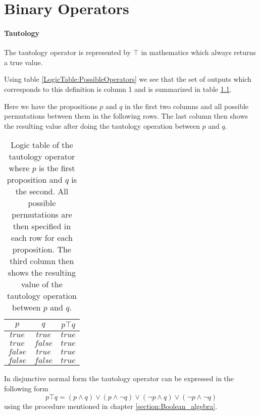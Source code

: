 \appendix

\chapter{Binary Operators}
\label{appendix:Binaray_Operators}
    \subsubsection{Tautology}
        The tautology operator is represented by $\top$ in mathematics which always returns a true value.
        
        Using table \ref{LogicTable:PossibleOperators} we see that the set of outputs which corresponds to this definition is column 1 and is summarized in table \ref{LogicTable:tautology}.
        
        Here we have the propositions $p$ and $q$ in the first two columns and all possible permutations between them in the following rows. The last column then shows the resulting value after doing the tautology operation between $p$ and $q$.
        
        \begin{table}[h!]
            \centering
            \begin{tabular}{|c|c|c|}
            	\hline
            	  $p$   &   $q$   & $p \top q$ \\ \hline
            	$true$  & $true$  &   $true$   \\ \hline
            	$true$  & $false$ &   $true$   \\ \hline
            	$false$ & $true$  &   $true$   \\ \hline
            	$false$ & $false$ &   $true$   \\ \hline
            \end{tabular}
            \caption{Logic table of the tautology operator where $p$ is the first proposition and $q$ is the second. All possible permutations are then specified in each row for each proposition. The third column then shows the resulting value of the tautology operation between $p$ and $q$.}
            \label{LogicTable:tautology}
        \end{table}
        
        In disjunctive normal form the tautology operator can be expressed in the following form
        \begin{equation}
            p \top q = (p \wedge q) \vee (p \wedge \neg q) \vee (\neg p \wedge q) \vee (\neg p \wedge \neg q)
        \end{equation}
        using the procedure mentioned in chapter \ref{section:Boolean_algebra}.
    
